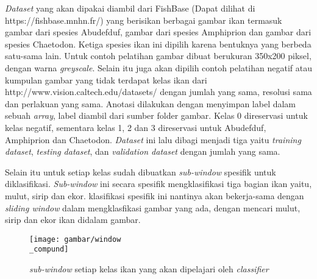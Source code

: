 \textit{Dataset} yang akan dipakai diambil dari FishBase (Dapat dilihat di https://fishbase.mnhn.fr/) yang 
berisikan berbagai gambar ikan termasuk gambar dari spesies Abudefduf, gambar dari spesies 
Amphiprion dan gambar dari spesies Chaetodon. 
Ketiga spesies ikan ini dipilih karena bentuknya yang berbeda satu-sama lain. %
Untuk contoh pelatihan gambar dibuat berukuran 350x200 piksel, 
dengan warna \textit{greyscale}. Selain itu juga akan dipilih contoh 
pelatihan negatif atau kumpulan gambar yang tidak terdapat kelas 
ikan dari http://www.vision.caltech.edu/datasets/ dengan jumlah yang sama, resolusi sama dan perlakuan 
yang sama. Anotasi dilakukan dengan menyimpan label dalam sebuah \textit{array}, label 
diambil dari sumber folder gambar. Kelas 0 direservasi untuk kelas negatif, sementara kelas 
1, 2 dan 3 direservasi untuk Abudefduf, Amphiprion dan Chaetodon.
\textit{Dataset} ini lalu dibagi menjadi tiga yaitu \textit{training dataset}, 
\textit{testing dataset}, dan \emph{validation dataset} dengan jumlah yang sama.

Selain itu untuk setiap kelas sudah dibuatkan \textit{sub-window} spesifik untuk diklasifikasi. 
\textit{Sub-window} ini secara spesifik mengklasifikasi tiga bagian ikan yaitu, mulut, sirip dan ekor. 
klasifikasi spesifik ini nantinya akan bekerja-sama dengan \textit{sliding window} dalam mengklasfikasi 
gambar yang ada, dengan mencari mulut, sirip dan ekor ikan didalam gambar.

\begin{figure}[H]
  \centering{}
	\texttt{[image: gambar/window\\\_compund]}
  \caption{\textit{sub-window} setiap kelas ikan yang akan dipelajari oleh \textit{classifier}}
\end{figure}


